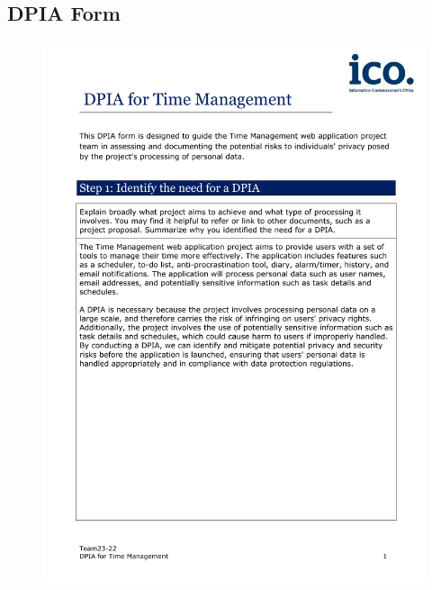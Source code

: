 \documentclass[a4paper]{article}
\begin{document}
\newpage

\subsection{DPIA Form}
\begin{figure}[H]
	\centering
	\includegraphics[width=1\textwidth]{./images/DPIA-Team23-22/DPIA-Team23-22_1.pdf}
	\label{Fig.DPIA_1}
\end{figure}
\end{document}
